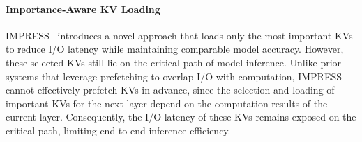 \paragraph{Importance-Aware KV Loading}  
IMPRESS~\cite{impress-fast25} introduces a novel approach that loads only the most important KVs to reduce I/O latency while maintaining comparable model accuracy. However, these selected KVs still lie on the critical path of model inference. Unlike prior systems that leverage prefetching to overlap I/O with computation, IMPRESS cannot effectively prefetch KVs in advance, since the selection and loading of important KVs for the next layer depend on the computation results of the current layer. Consequently, the I/O latency of these KVs remains exposed on the critical path, limiting end-to-end inference efficiency.








